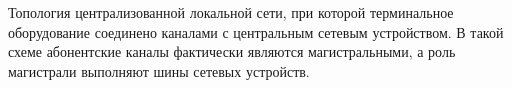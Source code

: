 Топология централизованной локальной сети, при которой
терминальное оборудование соединено каналами с 
центральным сетевым устройством. В такой схеме
абонентские каналы фактически являются магистральными,
а роль магистрали выполняют шины сетевых устройств.